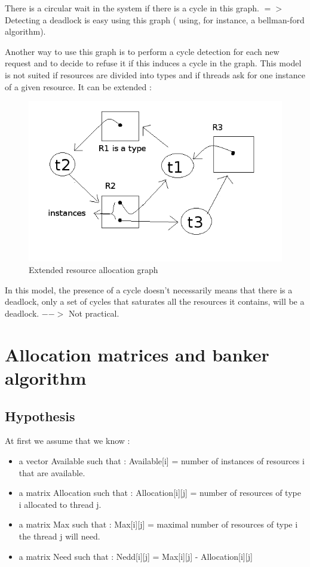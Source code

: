 \documentclass[a4paper,10pt]{article}
\begin{document}
There is a circular wait in the system if there is a cycle in this graph.
$=>$ Detecting a deadlock is easy using this graph ( using, for instance, a bellman-ford algorithm).

Another way to use this graph is to perform a cycle detection for each new request and to decide to refuse it if this induces a cycle in the graph.
This model is not suited if resources are divided into types and if threads ask for one instance of a given resource.
It can be extended :

\begin{figure}[h]
  \begin{center}
    \includegraphics[scale=0.6]{resource_graph_extended}
    \caption{Extended resource allocation graph}
  \end{center}
\end{figure}

In this model, the presence of a cycle doesn't necessarily means that there is a deadlock, only a set of cycles that saturates all the resources it contains, will be a deadlock. $-->$ Not practical.

\section{Allocation matrices and banker algorithm}

\subsection{Hypothesis}

At first we assume that we know :

\begin{itemize}
  \item a vector Available such that : Available[i] = number of instances of resources i that are available.
  \item a matrix Allocation such that : Allocation[i][j] = number of resources of type i allocated to thread j.
  \item a matrix Max such that : Max[i][j] = maximal number of resources of type i the thread j will need.
  \item a matrix Need such that : Nedd[i][j] = Max[i][j] - Allocation[i][j]
\end{itemize}
\end{document}
